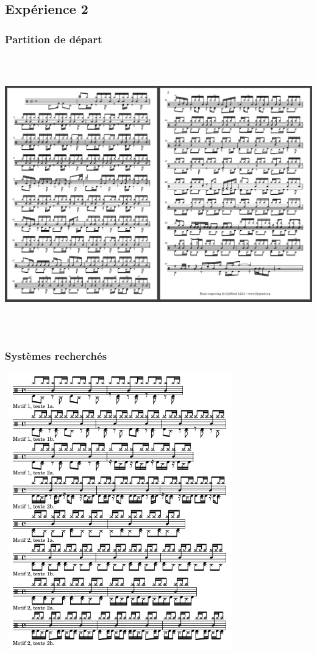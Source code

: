 \subsection{Expérience 2}
\subsubsection{Partition de départ}
\includegraphics[height=120mm, width=160mm]{z_images/3_experimentations/experience_1/partition.png}
\subsubsection{Systèmes recherchés}
\includegraphics[height=120mm, width=100mm]{z_images/3_experimentations/experience_1/systemes_recherches.png}